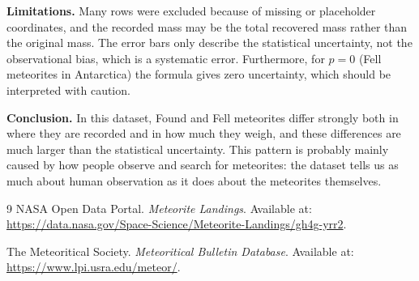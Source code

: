 \documentclass{article}
\begin{document}
\textbf{Limitations.} Many rows were excluded because of missing or placeholder coordinates, and the recorded mass may be the total recovered mass rather than the original mass. The error bars only describe the statistical uncertainty, not the observational bias, which is a systematic error. Furthermore, for $p=0$ (Fell meteorites in Antarctica) the formula gives zero uncertainty, which should be interpreted with caution.
 
\textbf{Conclusion.} In this dataset, Found and Fell meteorites differ strongly both in where they are recorded and in how much they weigh, and these differences are much larger than the statistical uncertainty. This pattern is probably mainly caused by how people observe and search for meteorites: the dataset tells us as much about human observation as it does about the meteorites themselves.
 
\begin{thebibliography}{9}
NASA Open Data Portal. \emph{Meteorite Landings}. Available at: \url{https://data.nasa.gov/Space-Science/Meteorite-Landings/gh4g-yrr2}.
 
The Meteoritical Society. \emph{Meteoritical Bulletin Database}. Available at: \url{https://www.lpi.usra.edu/meteor/}.
\end{thebibliography}
 
\end{document}
